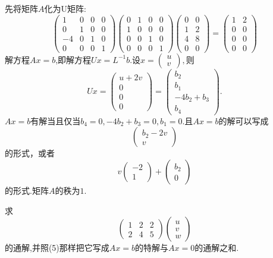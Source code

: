 ﻿\documentclass{book} \usepackage{exsheets} \usepackage{xeCJK}
\begin{document}
\begin{solution}
  先将矩阵$A$化为U矩阵:
$$
\begin{pmatrix}
  1&0&0&0\\
  0&1&0&0\\
  -4&0&1&0\\
  0&0&0&1
\end{pmatrix}
\begin{pmatrix}
  0&1&0&0\\
  1&0&0&0\\
  0&0&1&0\\
  0&0&0&1
\end{pmatrix}
\begin{pmatrix}
  0&0\\
  1&2\\
  4&8\\
  0&0
\end{pmatrix}=
\begin{pmatrix}
  1&2\\
  0&0\\
  0&0\\
  0&0
\end{pmatrix}
$$
解方程$Ax=b$,即解方程$Ux=L^{-1}b$.设$x=
\begin{pmatrix}
  u\\
  v
\end{pmatrix}, $则
$$
Ux=
\begin{pmatrix}
  u+2v\\
  0\\
  0\\
  0
\end{pmatrix}=
\begin{pmatrix}
  b_2\\
  b_1\\
  -4b_{2}+b_3\\
  b_{4}
\end{pmatrix}.
$$
$Ax=b$有解当且仅当$b_4=0,-4b_2+b_3=0,b_1=0$.且$Ax=b$的解可以写成
$$
\begin{pmatrix}
  b_2-2v\\
  v
\end{pmatrix}
$$
的形式，或者
$$
v
\begin{pmatrix}
  -2\\
  1
\end{pmatrix}+
\begin{pmatrix}
  b_2\\
  0
\end{pmatrix}
$$
的形式.矩阵$A$的秩为$1$.
\end{solution}
\begin{question}
  求
$$
\begin{pmatrix}
  1&2&2\\
  2&4&5
\end{pmatrix}
\begin{pmatrix}
  u\\
  v\\
  w
\end{pmatrix}
$$
的通解,并照(5)那样把它写成$Ax=b$的特解与$Ax=0$的通解之和.
\end{question}
\end{document}
